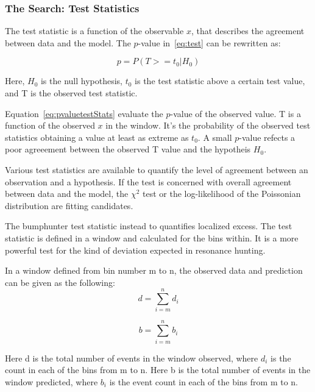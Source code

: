 \subsubsection{The Search: Test Statistics}
\label{teststatistics}

The test statistic is a function of the observable $x$, that describes the agreement between data and the model.  The $p$-value in~\ref{eq:test} can be rewritten as:
    
\begin{equation}
    p = P(T>=t_{0}| H_{0})
\label{eq:pvaluetestStats}
\end{equation}

Here, $H_0$ is the null hypothesis, $t_0$ is the test statistic above a certain test value, and T is the observed test statistic.

Equation~\ref{eq:pvaluetestStats} evaluate the $p$-value of the observed value. T is a function of the observed $x$ in the window. It's the probability of the observed test statistics obtaining a value at least as extreme as $t_{0}$. A small $p$-value refects a poor agreeement between the observed T value and the hypotheis $H_{0}$.

Various test statistics are available to quantify the level of agreement between an observation and a hypothesis. If the test is concerned with overall agreement between data and the model, the $\chi^{2}$ test or the log-likelihood of the Poissonian distribution are fitting candidates.

The bumphunter test statistic instead to quantifies localized excess. The test statistic is defined in a window and calculated for the bins within. It is a more powerful test for the kind of deviation expected in resonance hunting.

In a window defined from bin number m to n, the observed data and prediction can be given as the following: 
    \begin{equation}
         d= \sum_{i=m}^{n} d_i 
    \end{equation}

    
    \begin{equation}
         b= \sum_{i=m}^{n} b_i
    \end{equation}

    Here d is the total number of events in the window observed, where $d_i$ is the count in each of the bins from m to n. 
    Here b is the total number of events in the window predicted, where $b_i$ is the event count in each of the bins from m to n.
    
